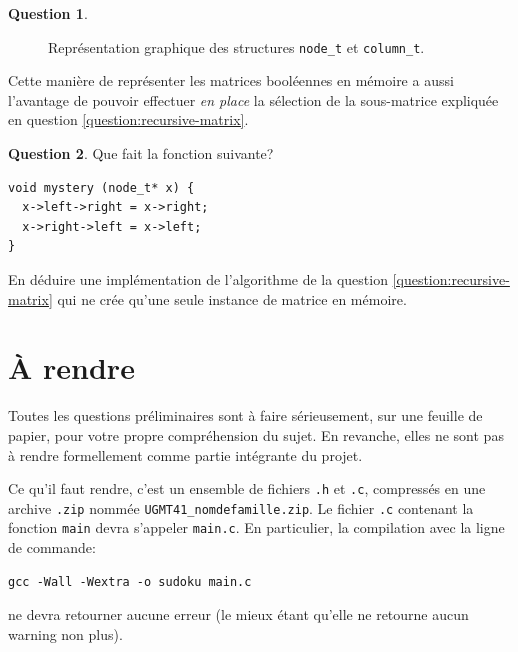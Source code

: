 \documentclass[french,a4paper]{article}
\theoremstyle{definition}
\newtheorem{question}{Question}
\theoremstyle{remark}
\newcommand{\shell}[1]{\lstinline[style={},style=sh]|#1|}
\newcommand{\inlinec}[1]{\lstinline[style=C]°#1°}
\begin{document}
\begin{question}
\begin{figure}[h]
%
    \caption{%
      Représentation graphique des structures \inlinec{node_t} et
      \inlinec{column_t}.}%
    \label{fig:4-way-matrix}%
  \end{figure}
\end{question}

Cette manière de représenter les matrices booléennes en mémoire a
aussi l'avantage de pouvoir effectuer {\em en place} la sélection de
la sous-matrice expliquée en question \ref{question:recursive-matrix}.

\begin{question}
  Que fait la fonction suivante?
  \begin{lstlisting}
void mystery (node_t* x) {
  x->left->right = x->right;
  x->right->left = x->left;
}
  \end{lstlisting}
  En déduire une implémentation de l'algorithme de la question
  \ref{question:recursive-matrix} qui ne crée qu'une seule instance de
  matrice en mémoire.
\end{question}

\section{\`A rendre}
\label{sec:actual-project}

Toutes les questions préliminaires sont à faire sérieusement, sur une
feuille de papier, pour votre propre compréhension du sujet. En
revanche, elles ne sont pas à rendre formellement comme partie
intégrante du projet.

\medskip

Ce qu'il faut rendre, c'est un ensemble de fichiers \shell{.h} et
\shell{.c}, compressés en une archive \shell{.zip} nommée
\shell{UGMT41_nomdefamille.zip}. Le fichier \shell{.c} contenant la
fonction \inlinec{main} devra s'appeler \shell{main.c}. En
particulier, la compilation avec la ligne de commande:
\begin{lstlisting}[style={},style=sh]
gcc -Wall -Wextra -o sudoku main.c
\end{lstlisting}
ne devra retourner aucune erreur (le mieux étant qu'elle ne retourne
aucun warning non plus).
\end{document}
